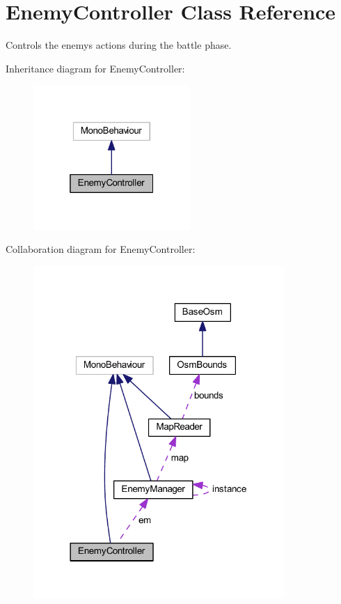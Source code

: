 \hypertarget{class_enemy_controller}{}\section{Enemy\+Controller Class Reference}
\label{class_enemy_controller}


Controls the enemy\textquotesingle{}s actions during the battle phase.  




Inheritance diagram for Enemy\+Controller\+:\nopagebreak
\begin{figure}[H]
\begin{center}
\leavevmode
\includegraphics[width=169pt]{class_enemy_controller__inherit__graph}
\end{center}
\end{figure}


Collaboration diagram for Enemy\+Controller\+:\nopagebreak
\begin{figure}[H]
\begin{center}
\leavevmode
\includegraphics[width=270pt]{class_enemy_controller__coll__graph}
\end{center}
\end{figure}
